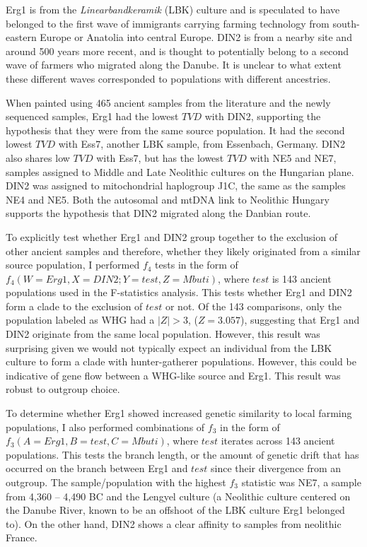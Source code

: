 Erg1 is from the \textit{Linearbandkeramik} (LBK) culture and is speculated to have belonged to the first wave of immigrants carrying farming technology from south-eastern Europe or Anatolia into central Europe. DIN2 is from a nearby site and around 500 years more recent, and is thought to potentially belong to a second wave of farmers who migrated along the Danube. It is unclear to what extent these different waves corresponded to populations with different ancestries.  

When painted using 465 ancient samples from the literature and the newly sequenced samples, Erg1 had the lowest $TVD$ with DIN2, supporting the hypothesis that they were from the same source population. It had the second lowest $TVD$ with Ess7, another LBK sample, from Essenbach, Germany. DIN2 also shares low $TVD$ with Ess7, but has the lowest $TVD$ with NE5 and NE7, samples assigned to Middle and Late Neolithic cultures on the Hungarian plane. DIN2 was assigned to mitochondrial haplogroup J1C, the same as the samples NE4 and NE5. Both the autosomal and mtDNA link to Neolithic Hungary supports the hypothesis that DIN2 migrated along the Danbian route.   

To explicitly test whether Erg1 and DIN2 group together to the exclusion of other ancient samples and therefore, whether they likely originated from a similar source population, I performed $f_{4}$ tests in the form of $f_{4}(W=Erg1, X=DIN2; Y=test, Z=Mbuti)$, where $test$ is 143 ancient populations used in the F-statistics analysis. This tests whether Erg1 and DIN2 form a clade to the exclusion of $test$ or not. Of the 143 comparisons, only the population labeled as WHG had a $|Z|>3$, ($Z=3.057$), suggesting that Erg1 and DIN2 originate from the same local population. However, this result was surprising given we would not typically expect an individual from the LBK culture to form a clade with hunter-gatherer populations. However, this could be indicative of gene flow between a WHG-like source and Erg1. This result was robust to outgroup choice.  

To determine whether Erg1 showed increased genetic similarity to local farming populations, I also performed combinations of $f_{3}$ in the form of $f_{3}(A=Erg1, B=test, C=Mbuti)$, where $test$ iterates across 143 ancient populations. This tests the branch length, or the amount of genetic drift that has occurred on the branch between Erg1 and $test$ since their divergence from an outgroup. The sample/population with the highest $f_{3}$ statistic was NE7, a sample from 4,360 – 4,490 BC and the Lengyel culture (a Neolithic culture centered on the Danube River, known to be an offshoot of the LBK culture Erg1 belonged to). On the other hand, DIN2 shows a clear affinity to samples from neolithic France.

